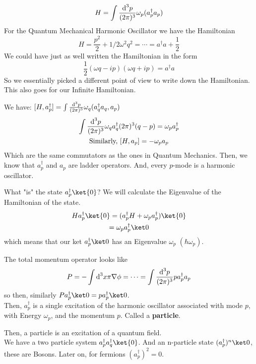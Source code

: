 \documentclass[]{scrartcl}
\begin{document}
\begin{equation}
	H = \int \frac{\text d^3p}{(2\pi)^3}\omega_p(a_p^\dagger a_p)
\end{equation}
For the Quantum Mechanical Harmonic Oscillator we have the Hamiltonian
\begin{equation}
	H = \frac{p^2}{2} + 1/2\omega^2q^2 = \cdots = a^\dagger a + \frac{1}{2}
\end{equation}
We could have just as well written the Hamiltonian in the form
\begin{equation}
	\frac{1}{2}(\omega q - ip)(\omega q + ip) = a^\dagger a
\end{equation}
So we essentially picked a different point of view to write down the Hamiltonian. This also goes for our Infinite Hamiltonian.

We have: $[H, a_p^\dagger] = \int \frac{\text d^3p}{(2\pi)^3} \omega_q (a_q^\dagger a_q, a_p)$
\begin{gather}
	\int \frac{\text d^3p}{(2\pi)^3} \omega_q a_q^\dagger (2\pi)^3(q-p) = \omega_p a_p^\dagger\\
	\text{Similarly, } [H, a_p] = -\omega_p a_p
\end{gather}
Which are the same commutators as the ones in Quantum Mechanics. Then, we know that $a_p^\dagger$ and $a_p$ are ladder operators. And, every $p$-mode is a harmonic oscillator.

What "is" the state $a_p^\dagger \ket{0}$? We will calculate the Eigenvalue of the Hamiltonian of the state.
\begin{gather}
	Ha_p^\dagger \ket{0} = (a_p^\dagger H + \omega_p a_p^\dagger) \ket{0}\\
	= \omega_p a_p^\dagger \ket 0
\end{gather}
which means that our ket $a_p^\dagger\ket0$ has an Eigenvalue $\omega_p$ $(\hbar\omega_p)$.

The total momentum operator looks like
\begin{equation}
	P = -\int \text d^3x \pi\nabla\phi = \cdots = \int\frac{\text d^3p}{(2\pi)^3}pa_p^\dagger a_p
\end{equation}
so then, similarly $P a_p^\dagger \ket 0 = p a_p^\dagger \ket 0$.\\
Then, $a_p^\dagger$ is a single excitation of the harmonic oscillator associated with mode $p$, with Energy $\omega_p$, and the momentum $p$. Called a \textbf{particle}.

Then, a particle is an excitation of a quantum field.\\
We have a two particle system $a_p^\dagger a_q^\dagger \ket{0}$. And an n-particle state $(a_p^\dagger)^n\ket 0$, these are Bosons. Later on, for fermions $(a_p^\dagger)^2 = 0$.
\end{document}
